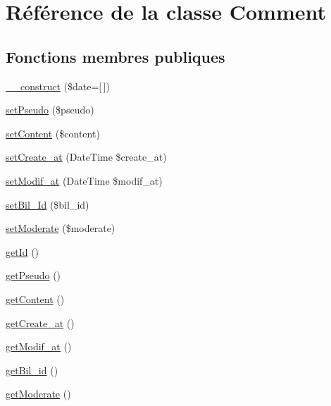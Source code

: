 \hypertarget{class_src_1_1_entity_1_1_comment}{}\section{Référence de la classe Comment}
\label{class_src_1_1_entity_1_1_comment}
\subsection*{Fonctions membres publiques}
\begin{DoxyCompactItemize}
\item 
\hyperlink{class_src_1_1_entity_1_1_comment_a594620c0e8c7693172eee4901c0b7705}{\+\_\+\+\_\+construct} (\$date=\mbox{[}$\,$\mbox{]})
\item 
\hyperlink{class_src_1_1_entity_1_1_comment_a1d65ce1d25ffb871a48d33715e6b6bef}{set\+Pseudo} (\$pseudo)
\item 
\hyperlink{class_src_1_1_entity_1_1_comment_a04a5eddb7c3abc7bf31fa25b58f046bf}{set\+Content} (\$content)
\item 
\hyperlink{class_src_1_1_entity_1_1_comment_ad12db04fd7abd82e8172ebee19c45ff1}{set\+Create\+\_\+at} (Date\+Time \$create\+\_\+at)
\item 
\hyperlink{class_src_1_1_entity_1_1_comment_a9f9f5983de6ae197176a80f55f113a6c}{set\+Modif\+\_\+at} (Date\+Time \$modif\+\_\+at)
\item 
\hyperlink{class_src_1_1_entity_1_1_comment_a2e409e601842718df8e3fb392a6553a2}{set\+Bil\+\_\+\+Id} (\$bil\+\_\+id)
\item 
\hyperlink{class_src_1_1_entity_1_1_comment_a0067c44a7d1de40089ffed311672b328}{set\+Moderate} (\$moderate)
\item 
\hyperlink{class_src_1_1_entity_1_1_comment_a12251d0c022e9e21c137a105ff683f13}{get\+Id} ()
\item 
\hyperlink{class_src_1_1_entity_1_1_comment_a7151e41f7b522d26d02102d970e9a309}{get\+Pseudo} ()
\item 
\hyperlink{class_src_1_1_entity_1_1_comment_a58e43f09a06ce4e29b192c4e17ce7915}{get\+Content} ()
\item 
\hyperlink{class_src_1_1_entity_1_1_comment_ae5e6c0bedcef3f514100c20ee92c901a}{get\+Create\+\_\+at} ()
\item 
\hyperlink{class_src_1_1_entity_1_1_comment_a5858386cc69be9863ed37e0ceb2697b1}{get\+Modif\+\_\+at} ()
\item 
\hyperlink{class_src_1_1_entity_1_1_comment_a1df6ee009c81d0d807d36d18d40b9e97}{get\+Bil\+\_\+id} ()
\item 
\hyperlink{class_src_1_1_entity_1_1_comment_a6d3a6a148bf0c8752548e7e7ab149abb}{get\+Moderate} ()
\end{DoxyCompactItemize}



